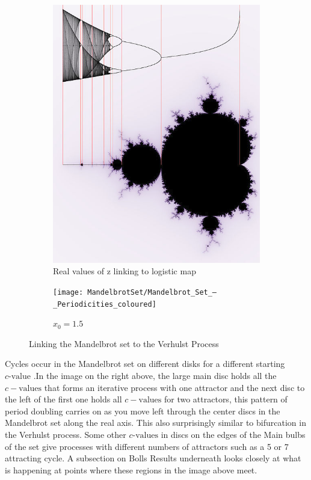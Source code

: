 \documentclass[a4wide, 10pt]{article}
\begin{document}
   \begin{figure}[H]
        \centering
        \begin{subfigure}[b]{0.3\textwidth}
                \includegraphics[width=\textwidth]{MandelbrotSet/Verhulst-Mandelbrot-Bifurcation}
                \caption{Real values of z linking to logistic map\cite{Bifurcation in Mandelbrot Set 1}}
        \end{subfigure}
        \begin{subfigure}[b]{0.3\textwidth}
                \texttt{[image: MandelbrotSet/Mandelbrot\_Set\_–\_Periodicities\_coloured]}
                \caption{$x_{0} = 1.5$\cite{Bifurcation in Mandelbrot Set 2}}
        \end{subfigure}

        \caption{Linking the Mandelbrot set to the Verhulst Process}
\end{figure}

Cycles occur in the Mandelbrot set on different disks for a different starting $c \textrm{-value}$ .In
 the image on the right above, the large main disc holds all the $c-\textrm{values}$ that forms an
  iterative process with one attractor and the next disc to the left of the first one holds all $c-
  \textrm{values}$ for two attractors, this pattern of period doubling carries on as you move left
   through the center discs in the Mandelbrot set along the real axis. This also surprisingly similar
    to bifurcation in the Verhulst process. Some other $c \textrm{-values}$ in discs on the edges of
     the Main bulbs of the set give processes with different numbers of attractors such as a 5 or 7
      attracting cycle.  A subsection on Bolls Results underneath looks closely at what is happening at
       points where these regions in the image above meet.
\end{document}
